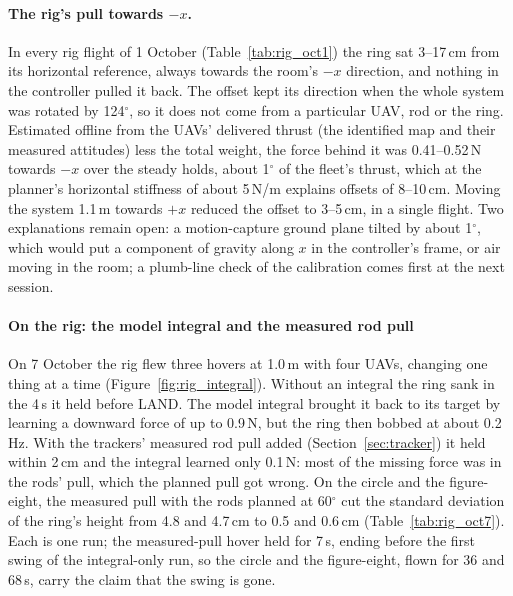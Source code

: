 \paragraph{The rig's pull towards $-x$.} In every rig flight of 1 October (Table~\ref{tab:rig_oct1}) the ring
sat 3--17\,cm from its horizontal reference, always towards the room's $-x$ direction, and nothing in the
controller pulled it back. The offset kept its direction when the whole system was rotated by 124$^\circ$,
so it does not come from a particular UAV, rod or the ring. Estimated offline from the UAVs' delivered thrust
(the identified map and their measured attitudes) less the total weight, the force behind it was
0.41--0.52\,N towards $-x$ over the steady holds, about 1$^\circ$ of the fleet's thrust, which at the
planner's horizontal stiffness of about 5\,N/m explains offsets of 8--10\,cm. Moving the system 1.1\,m
towards $+x$ reduced the offset to 3--5\,cm, in a single flight. Two explanations remain open: a
motion-capture ground plane tilted by about 1$^\circ$, which would put a component of gravity along $x$ in
the controller's frame, or air moving in the room; a plumb-line check of the calibration comes first at the
next session.

\paragraph{On the rig: the model integral and the measured rod pull}
\label{sec:res_rig_integral}

On 7 October the rig flew three hovers at 1.0\,m with four UAVs, changing one thing at a time
(Figure~\ref{fig:rig_integral}). Without an integral the ring sank in the 4\,s it held before LAND. The model
integral brought it back to its target by learning a downward force of up to 0.9\,N, but the ring then bobbed
at about 0.2\,Hz. With the trackers' measured rod pull added (Section~\ref{sec:tracker}) it held within 2\,cm
and the integral learned only 0.1\,N: most of the missing force was in the rods' pull, which the planned pull
got wrong. On the circle and the figure-eight, the measured pull with the rods planned at 60$^\circ$ cut the
standard deviation of the ring's height from 4.8 and 4.7\,cm to 0.5 and 0.6\,cm (Table~\ref{tab:rig_oct7}).
Each is one run; the measured-pull hover held for 7\,s, ending before the first swing of the integral-only
run, so the circle and the figure-eight, flown for 36 and 68\,s, carry the claim that the swing is gone.


